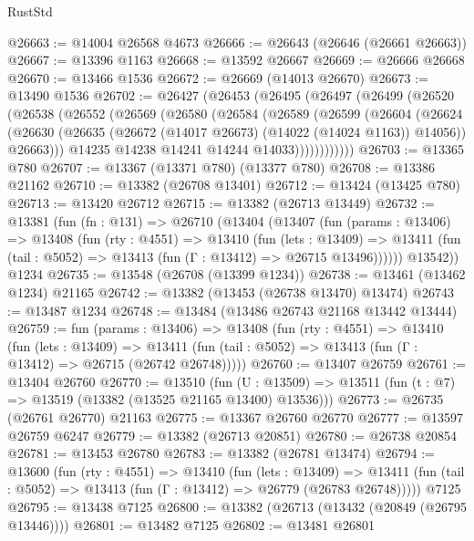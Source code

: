\begin{lexlean}{RustStd}
\begin{coremodule}
@26663 := @14004 @26568 @4673
@26666 := @26643 (@26646 (@26661 @26663))
@26667 := @13396 @1163
@26668 := @13592 @26667
@26669 := @26666 @26668
@26670 := @13466 @1536
@26672 := @26669 (@14013 @26670)
@26673 := @13490 @1536
@26702 := @26427
    (@26453
      (@26495
        (@26497
          (@26499
            (@26520
              (@26538
                (@26552
                  (@26569
                    (@26580
                      (@26584
                        (@26589
                          (@26599
                            (@26604
                              (@26624
                                (@26630
                                  (@26635 (@26672 (@14017 @26673) (@14022 (@14024 @1163)) @14056))
                                  @26663)))
                            @14235
                            @14238
                            @14241
                            @14244
                            @14033))))))))))))
@26703 := @13365 @780
@26707 := @13367 (@13371 @780) (@13377 @780)
@26708 := @13386 @21162
@26710 := @13382 (@26708 @13401)
@26712 := @13424 (@13425 @780)
@26713 := @13420 @26712
@26715 := @13382 (@26713 @13449)
@26732 := @13381
    (fun (fn : @131) =>
    @26710
      (@13404
        (@13407
          (fun (params : @13406) =>
          @13408
            (fun (rty : @4551) =>
            @13410
              (fun (lets : @13409) =>
              @13411 (fun (tail : @5052) => @13413 (fun (Γ : @13412) => @26715 @13496))))))
        @13542))
    @1234
@26735 := @13548 (@26708 (@13399 @1234))
@26738 := @13461 (@13462 @1234) @21165
@26742 := @13382 (@13453 (@26738 @13470) @13474)
@26743 := @13487 @1234
@26748 := @13484 (@13486 @26743 @21168 @13442 @13444)
@26759 := fun (params : @13406) =>
  @13408
    (fun (rty : @4551) =>
    @13410
      (fun (lets : @13409) =>
      @13411 (fun (tail : @5052) => @13413 (fun (Γ : @13412) => @26715 (@26742 @26748)))))
@26760 := @13407 @26759
@26761 := @13404 @26760
@26770 := @13510
    (fun (U : @13509) => @13511 (fun (t : @7) => @13519 (@13382 (@13525 @21165 @13400) @13536)))
@26773 := @26735 (@26761 @26770) @21163
@26775 := @13367 @26760 @26770
@26777 := @13597 @26759 @6247
@26779 := @13382 (@26713 @20851)
@26780 := @26738 @20854
@26781 := @13453 @26780
@26783 := @13382 (@26781 @13474)
@26794 := @13600
    (fun (rty : @4551) =>
    @13410
      (fun (lets : @13409) =>
      @13411 (fun (tail : @5052) => @13413 (fun (Γ : @13412) => @26779 (@26783 @26748)))))
    @7125
@26795 := @13438 @7125
@26800 := @13382 (@26713 (@13432 (@20849 (@26795 @13446))))
@26801 := @13482 @7125
@26802 := @13481 @26801

\end{coremodule}
\end{lexlean}

